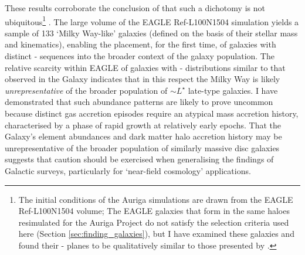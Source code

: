 These results corroborate the conclusion of \citet{2017arXiv170807834G} that such a dichotomy is not ubiquitous\footnote{The initial conditions of the Auriga simulations are drawn from the EAGLE Ref-L100N1504 volume; The EAGLE galaxies that form in the same haloes resimulated for the Auriga Project do not satisfy the selection criteria used here (Section \ref{sec:finding_galaxies}), but I have examined these galaxies and found their \afe{}-\feh{} planes to be qualitatively similar to those presented by \citet{2017arXiv170807834G}.} \citep[c.f also][]{2012MNRAS.426..690B,2014A&A...572A..92M}. The large volume of the EAGLE Ref-L100N1504 simulation yields a sample of 133 `Milky Way-like' galaxies (defined on the basis of their stellar mass and kinematics), enabling the placement, for the first time, of galaxies with distinct \afe{}-\feh{} sequences into the broader context of the galaxy population. The relative scarcity within EAGLE of galaxies with \afe{}-\feh{} distributions similar to that observed in the Galaxy indicates that in this respect the Milky Way is likely \emph{unrepresentative} of the broader population of $\sim L^\star$ late-type galaxies. I have demonstrated that such abundance patterns are likely to prove uncommon because distinct gas accretion episodes require an atypical mass accretion history, characterised by a phase of rapid growth at relatively early epochs. That the Galaxy's element abundances and dark matter halo accretion history may be unrepresentative of the broader population of similarly massive disc galaxies suggests that caution should be exercised when generalising the findings of Galactic surveys, particularly for `near-field cosmology' applications.

